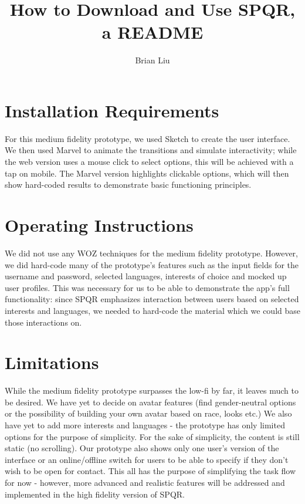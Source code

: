 \documentclass{article}
\title{How to Download and Use SPQR, a README}
\author{Brian Liu}
\begin{document}
\maketitle

\section{Installation Requirements}
For this medium fidelity prototype, we used Sketch to create the user interface. We then used Marvel to animate the transitions and simulate interactivity; while the web version uses a mouse click to select options, this will be achieved with a tap on mobile. The Marvel version highlights clickable options, which will then show hard-coded results to demonstrate basic functioning principles. 

\section{Operating Instructions}
We did not use any WOZ techniques for the medium fidelity prototype. However, we did hard-code many of the prototype's features such as the input fields for the username and password, selected languages, interests of choice and mocked up user profiles. This was necessary for us to be able to demonstrate the app's full functionality: since SPQR emphasizes interaction between users based on selected interests and languages, we needed to hard-code the material which we could base those interactions on. 


\section{Limitations}
While the medium fidelity prototype surpasses the low-fi by far, it leaves much to be desired. We have yet to decide on avatar features (find gender-neutral options or the possibility of building your own avatar based on race, looks etc.) We also have yet to add more interests and languages - the prototype has only limited options for the purpose of simplicity. For the sake of simplicity, the content is still static (no scrolling). Our prototype also shows only one user's version of the interface or an online/offline switch for users to be able to specify if they don't wish to be open for contact. This all has the purpose of simplifying the task flow for now - however, more advanced and realistic features will be addressed and implemented in the high fidelity version of SPQR.
\end{document}
